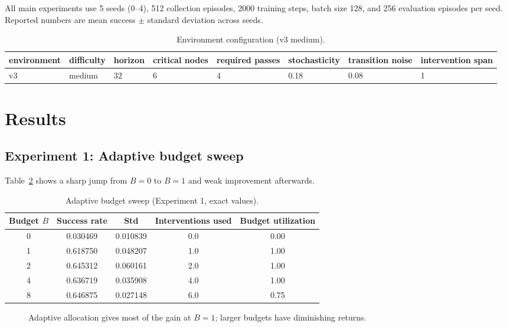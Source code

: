 \documentclass{article}
\begin{document}
All main experiments use 5 seeds (0--4), 512 collection episodes, 2000 training steps, batch size 128, and 256 evaluation episodes per seed. Reported numbers are mean success $\pm$ standard deviation across seeds.

\begin{table}[t]
\centering
\caption{Environment configuration (v3 medium).}
\label{tab:env}
\begin{tabular}{llllllll}
\toprule
environment & difficulty & horizon & critical nodes & required passes & stochasticity & transition noise & intervention span \\
\midrule
v3 & medium & 32 & 6 & 4 & 0.18 & 0.08 & 1 \\
\bottomrule
\end{tabular}
\end{table}

\section{Results}
\subsection{Experiment 1: Adaptive budget sweep}
Table~\ref{tab:adaptive_sweep} shows a sharp jump from $B{=}0$ to $B{=}1$ and weak improvement afterwards.

\begin{table}[t]
\centering
\caption{Adaptive budget sweep (Experiment 1, exact values).}
\label{tab:adaptive_sweep}
\begin{tabular}{ccccc}
\toprule
Budget $B$ & Success rate & Std & Interventions used & Budget utilization \\
\midrule
0 & 0.030469 & 0.010839 & 0.0 & 0.00 \\
1 & 0.618750 & 0.048207 & 1.0 & 1.00 \\
2 & 0.645312 & 0.060161 & 2.0 & 1.00 \\
4 & 0.636719 & 0.035908 & 4.0 & 1.00 \\
8 & 0.646875 & 0.027148 & 6.0 & 0.75 \\
\bottomrule
\end{tabular}
\end{table}

\begin{figure}[t]
\centering
{}
\caption{Adaptive allocation gives most of the gain at $B{=}1$; larger budgets have diminishing returns.}
\label{fig:adaptive_sweep}
\end{figure}
\end{document}

